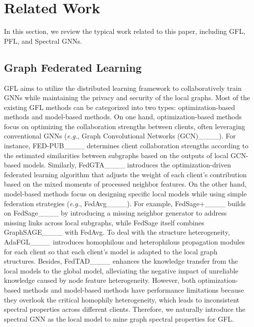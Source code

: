 \section{Related Work}
In this section, we review the typical work related to this paper, including GFL, PFL, and Spectral GNNs.

\subsection{Graph Federated Learning}
GFL aims to utilize the distributed learning framework to collaboratively train GNNs while maintaining the privacy and security of the local graphs. Most of the existing GFL methods can be categorized into two types: optimization-based methods and model-based methods. On one hand, optimization-based methods focus on optimizing the collaboration strengths between clients, often leveraging conventional GNNs (\textit{e.g.}, Graph Convolutional Networks (GCN)____). For instance, FED-PUB____ determines client collaboration strengths according to the estimated similarities between subgraphs based on the outputs of local GCN-based models. Similarly, FedGTA____ introduces the optimization-driven federated learning algorithm that adjusts the weight of each client's contribution based on the mixed moments of processed neighbor features. On the other hand, model-based methods focus on designing specific local models while using simple federation strategies (\textit{e.g.}, FedAvg____). For example, FedSage+____ builds on FedSage____ by introducing a missing neighbor generator to address missing links across local subgraphs, while FedSage itself combines GraphSAGE____ with FedAvg. To deal with the structure heterogeneity, AdaFGL____ introduces homophilous and heterophilous propagation modules for each client so that each client's model is adapted to the local graph structures. Besides, FedTAD____ enhances the knowledge transfer from the local models to the global model, alleviating the negative impact of unreliable knowledge caused by node feature heterogeneity. However, both optimization-based methods and model-based methods have performance limitations because they overlook the critical homophily heterogeneity, which leads to inconsistent spectral properties across different clients. Therefore, we naturally introduce the spectral GNN as the local model to mine graph spectral properties for GFL.

